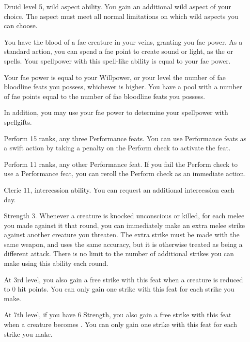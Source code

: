 \featpres Druid level 5, wild aspect ability.
\featben You gain an additional wild aspect of your choice.
The aspect must meet all normal limitations on which wild aspects you can choose.

\featben You have the blood of a fae creature in your veins, granting you fae power.
As a standard action, you can spend a fae point to create sound or light, as the  or  spells.
Your spellpower with this spell-like ability is equal to your fae power.

Your fae power is equal to your Willpower, or your level \add the number of fae bloodline feats you possess, whichever is higher.
You have a pool with a number of fae points equal to the number of fae bloodline feats you possess.

In addition, you may use your fae power to determine your spellpower with spellgifts.

\featpres Perform 15 ranks, any three Performance feats.
\featben You can use Performance feats as a swift action by taking a  penalty on the Perform check to activate the feat.

\featpres Perform 11 ranks, any other Performance feat.
\featben If you fail the Perform check to use a Performance feat, you can reroll the Perform check as an immediate action.

\featpres Cleric 11, intercession ability.
\featben You can request an additional intercession each day.

\featpre Strength 3.
\featben Whenever a creature is knocked unconscious or killed, for each melee  you made against it that round, you can immediately make an extra melee strike against another creature you threaten.
The extra strike must be made with the same weapon, and uses the same accuracy, but it is otherwise treated as being a different attack.
There is no limit to the number of additional strikes you can make using this ability each round.

At 3rd level, you also gain a free strike with this feat when a creature is reduced to 0 hit points.
You can only gain one strike with this feat for each strike you make.

At 7th level, if you have 6 Strength, you also gain a free strike with this feat when a creature becomes \bloodied.
You can only gain one strike with this feat for each strike you make.

